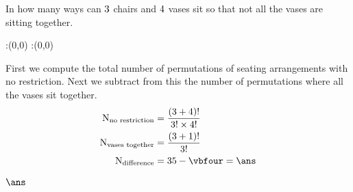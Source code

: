 



\gcalcexpr[0]{\ans}{\vbthree-\vbfour}
\question[3] In how many ways can $3$ chairs and $4$ vases sit so that
not all the vases are sitting together.


\watchout

\ifprintanswers
  \begin{marginfigure}
      :(0,0)
      :(0,0)
    \figdrawbegin{}
      \figdrawline [100,101]
    \figdrawend
    \figvisu{\figBoxA}{}{%
    }
    \centerline{\box\figBoxA}
  \end{marginfigure}
\fi 

\begin{solution}[\mcq]
  First we compute the total number of permutations of seating arrangements
  with no restriction. Next we subtract from this the number of permutations 
  where all the vases sit together. 
  \begin{align}
        \text{N}_{\text{no restriction}} 
            &= \dfrac{(\vbone+\vbtwo)!}{\vbone!\times\vbtwo!} \\
  	\text{N}_{\text{vases together}} 
            &= \dfrac{(\vbone+1)!}{\vbone!} \\ 
        \text{N}_{\text{difference}}     
            &= \vbthree - \vbfour = \ans 
  \end{align}
\end{solution}

\ifprintanswers\begin{codex}$\ans$\end{codex}\fi
